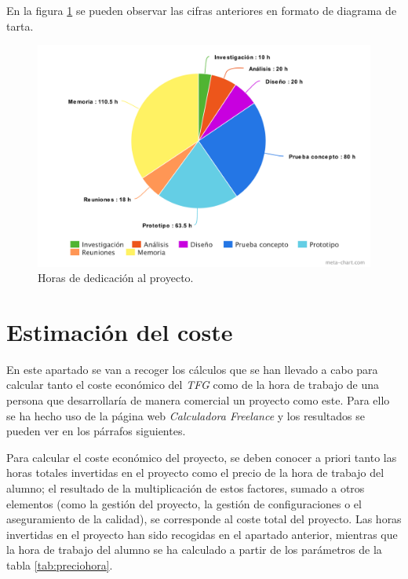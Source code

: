 En la figura \ref{fig:esfuerzos} se pueden observar las cifras anteriores en formato de diagrama de tarta. 

\begin{figure}[!h]
    \centering
    \includegraphics[width=\textwidth,height=\textheight,keepaspectratio]{Imagenes/esfuerzos}
    \caption{Horas de dedicación al proyecto.}
    \label{fig:esfuerzos}
\end{figure}


\section{Estimación del coste} \label{gestion.estimacion}

En este apartado se van a recoger los cálculos que se han llevado a cabo para calcular tanto el coste económico del \textit{TFG} como de la hora de trabajo de una persona que desarrollaría de manera comercial un proyecto como este. Para ello se ha hecho uso de la página web \textit{Calculadora Freelance} \cite{calculadorafreelance} y los resultados se pueden ver en los párrafos siguientes. 
\par 
Para calcular el coste económico del proyecto, se deben conocer a priori tanto las horas totales invertidas en el proyecto como el precio de la hora de trabajo del alumno; el resultado de la multiplicación de estos factores, sumado a otros elementos (como la gestión del proyecto, la gestión de configuraciones o el aseguramiento de la calidad), se corresponde al coste total del proyecto. Las horas invertidas en el proyecto han sido recogidas en el apartado anterior, mientras que la hora de trabajo del alumno se ha calculado a partir de los parámetros de la tabla \ref{tab:preciohora}.


